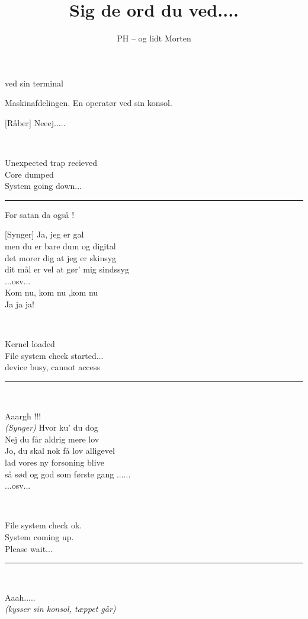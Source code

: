 \documentclass[a4paper,11pt]{article}
\title{Sig de ord du ved....}
\author{PH -- og lidt Morten}
\begin{document}
\maketitle

\begin{roles}
 ved sin terminal
\end{roles}

\begin{sketch}
\scene
Maskinafdelingen. En operatør ved sin konsol.

[Råber] Neeej.....

 \rule{0ex}{0ex}\\ {\sf
	Unexpected trap recieved\\
	Core dumped\\
	System going down...\rule[-0.3ex]{1ex}{1em}}

For satan da også !

[Synger]
Ja, jeg er gal\\
men du er bare dum og digital\\
det morer dig at jeg er skinsyg\\
dit mål er vel at gør' mig sindssyg\\ 
...osv...\\

\medskip
\noindent
Kom nu, kom nu ,kom nu\\
\medskip
Ja ja ja!\\

\noindent 
{} \rule{0em}{0em} \\{\sf
Kernel loaded\\
File system check started...\\
device busy, cannot access \rule[-0.3ex]{1ex}{1em}\\}

 Aaargh !!!\\
\medskip
{\em (Synger)}
\medskip
Hvor ku' du dog\\
Nej du får aldrig mere lov\\
Jo, du skal nok få lov alligevel\\
lad vores ny forsoning blive\\
så sød og god som første gang ......\\
...osv...\\

\rule{0em}{0em}\\ {\sf
File system check ok.\\
System coming up.\\
Please wait...\rule[-0.3ex]{1ex}{1em}\\}

Aaah.....
\medskip \\
{\em (kysser sin konsol, tæppet går)}

\end{sketch}
\end{document}
